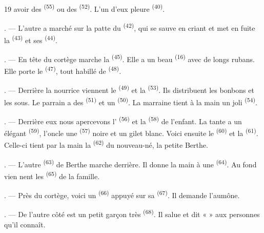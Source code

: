 \begin{VUpage}[21]{19}
\VUcontinue
avoir des  \textsuperscript{(55)} ou des  \textsuperscript{(52)}. L'un d'eux\nl
pleure \textsuperscript{(40)}.

. --- L'autre a marché sur la patte du \nl
{} \textsuperscript{(42)}, qui se sauve en criant et met en fuite la\nl
{} \textsuperscript{(43)} et ses  \textsuperscript{(44)}.

. --- En tête du cortège marche la  \textsuperscript{(45)}.\nl
Elle a un beau  \textsuperscript{(16)} avec de longs rubans.\nl
Elle porte le  \textsuperscript{(47)}, tout habillé de \cc
{} \textsuperscript{(48)}.

. --- Derrière la nourrice viennent le  \textsuperscript{(49)}\nl
et la  \textsuperscript{(53)}. Ils distribuent les bonbons et\nl
les sous. Le parrain a des  \textsuperscript{(51)} et un \nl
{} \textsuperscript{(50)}. La marraine tient à la main un\nl
joli  \textsuperscript{(54)}.

. --- Derrière eux nous apercevons l' \textsuperscript{(56)} et\nl
la  \textsuperscript{(58)} de l'enfant. La tante a un élégant \cc
{} \textsuperscript{(59)}, l'oncle une  \textsuperscript{(57)} noire et un gilet\nl
blanc. Voici ensuite le  \textsuperscript{(60)} et la  \textsuperscript{(61)}.\nl
Celle-ci tient par la main la  \textsuperscript{(62)} du nouveau-né,\nl
la petite Berthe.

. --- L'autre \textsuperscript{(63)} de Berthe marche derrière.\nl
Il donne la main à une  \textsuperscript{(64)}. Au fond vien\cc
nent les  \textsuperscript{(65)} de la famille.

. --- Près du cortège, voici un  \textsuperscript{(66)}\nl
appuyé sur sa  \textsuperscript{(67)}. Il demande l'aumône.

. --- De l'autre côté est un petit garçon très\nl
{} \textsuperscript{(68)}. Il salue et dit «  » aux personnes\nl
qu'il connaît.


\end{VUpage}
